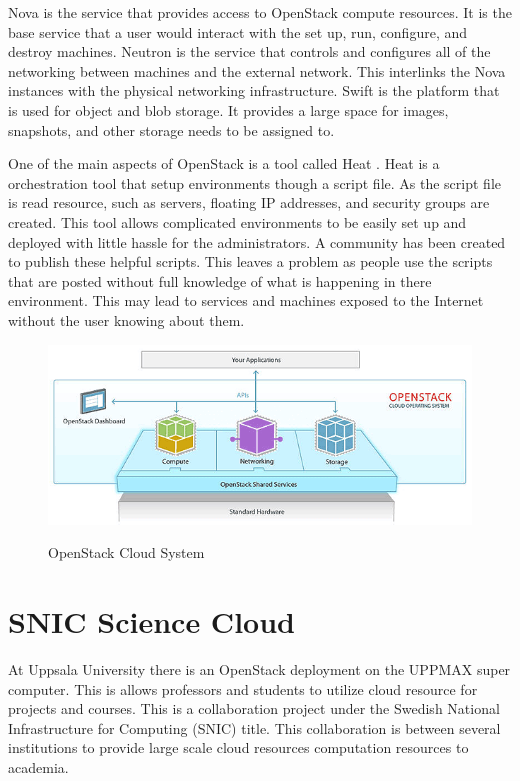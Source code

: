 \documentclass[12pt]{article}
\begin{document}
Nova is the service that provides access to OpenStack compute resources. It is the base service that a user would interact with the set up, run, configure, and destroy machines. Neutron is the service that controls and configures all of the networking between machines and the external network. This interlinks the Nova instances with the physical networking infrastructure.  Swift is the platform that is used for object and blob storage. It provides a large space for images, snapshots, and other storage needs to be assigned to.

One of the main aspects of OpenStack is a tool called Heat \cite{HeatOS}. Heat is a orchestration tool that setup environments though a script file. As the script file is read resource, such as servers, floating IP addresses, and security groups are created. This tool allows complicated environments to be easily set up and deployed with little hassle for the administrators. A community has been created to publish these helpful scripts. This leaves a problem as people use the scripts that are posted without full knowledge of what is happening in there environment. This may lead to services and machines exposed to the Internet without the user knowing about them.
\begin{figure}[H]
    \centering
    \includegraphics[scale=.6]{./pic/openstack-sm.png}
    \label{fig:OpenStack}
    \caption{OpenStack Cloud System}
\end{figure}

\section{SNIC Science Cloud}
At Uppsala University there is an OpenStack deployment on the UPPMAX super computer. This is allows professors and students to utilize cloud resource for projects and courses.  This is a collaboration project under the Swedish National Infrastructure for Computing (SNIC) title.  This collaboration is between several institutions to provide large scale cloud resources computation resources to academia.
\end{document}
